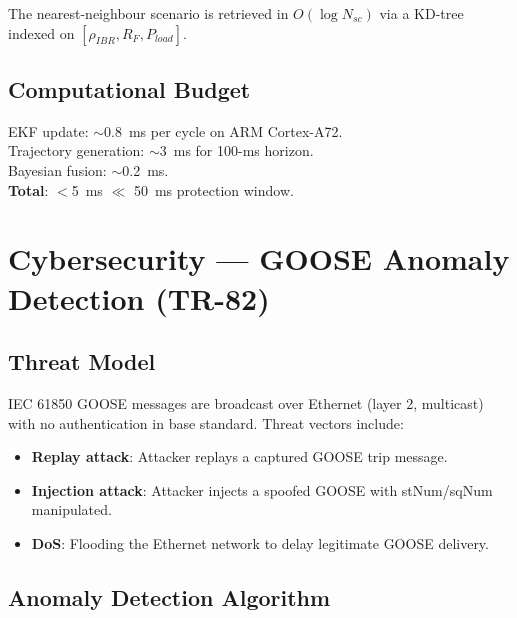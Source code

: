 \documentclass[11pt,a4paper]{report}
\newcommand{\cmark}{\ding{51}}
\begin{document}
The nearest-neighbour scenario is retrieved in $O(\log N_{sc})$ via a KD-tree indexed on $[\rho_{IBR}, R_F, P_{load}]$.

\section{Computational Budget}

EKF update: $\sim$\SI{0.8}{\milli\second} per cycle on ARM Cortex-A72.\\
Trajectory generation: $\sim$\SI{3}{\milli\second} for 100-ms horizon.\\
Bayesian fusion: $\sim$\SI{0.2}{\milli\second}.\\
\textbf{Total}: $<$\SI{5}{\milli\second} $\ll$ \SI{50}{\milli\second} protection window. \cmark

\chapter{Cybersecurity — GOOSE Anomaly Detection (TR-82)}
\label{ch:cyber}

\section{Threat Model}

IEC 61850 GOOSE messages are broadcast over Ethernet (layer 2, multicast) with no authentication in base standard. Threat vectors include:

\begin{itemize}
  \item \textbf{Replay attack}: Attacker replays a captured GOOSE trip message.
  \item \textbf{Injection attack}: Attacker injects a spoofed GOOSE with stNum/sqNum manipulated.
  \item \textbf{DoS}: Flooding the Ethernet network to delay legitimate GOOSE delivery.
\end{itemize}

\section{Anomaly Detection Algorithm}

\begin{algorithm}[H]
\caption{GOOSE Anomaly Detector — TR-82}
\label{alg:goose}
\BlankLine
{}
\end{algorithm}
\end{document}
